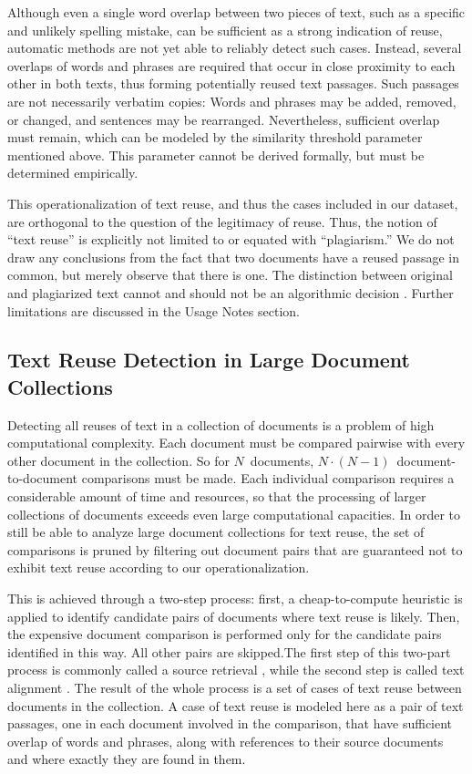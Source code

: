 \documentclass[fleqn,10pt]{wlscirep}
\begin{document}
Although even a single word overlap between two pieces of text, such as a specific and unlikely spelling mistake, can be sufficient as a strong indication of reuse, automatic methods are not yet able to reliably detect such cases. Instead, several overlaps of words and phrases are required that occur in close proximity to each other in both texts, thus forming potentially reused text passages. Such passages are not necessarily verbatim copies: Words and phrases may be added, removed, or changed, and sentences may be rearranged. Nevertheless, sufficient overlap must remain, which can be modeled by the similarity threshold parameter mentioned above. This parameter cannot be derived formally, but must be determined empirically.

This operationalization of text reuse, and thus the cases included in our dataset, are orthogonal to the question of the legitimacy of reuse. Thus, the notion of ``text reuse'' is explicitly not limited to or equated with ``plagiarism.'' We do not draw any conclusions from the fact that two documents have a reused passage in common, but merely observe that there is one. The distinction between original and plagiarized text cannot and should not be an algorithmic decision \cite{weber-wulff:2019}. Further limitations are discussed in the Usage Notes section.


\subsection*{Text Reuse Detection in Large Document Collections}

Detecting all reuses of text in a collection of documents is a problem of high computational complexity. Each document must be compared pairwise with every other document in the collection. So for $N$~documents, $N\cdot (N-1)$~document-to-document comparisons must be made. Each individual comparison requires a considerable amount of time and resources, so that the processing of larger collections of documents exceeds even large computational capacities. In order to still be able to analyze large document collections for text reuse, the set of comparisons is pruned by filtering out document pairs that are guaranteed not to exhibit text reuse according to our operationalization.

This is achieved through a two-step process: first, a cheap-to-compute heuristic is applied to identify candidate pairs of documents where text reuse is likely. Then, the expensive document comparison is performed only for the candidate pairs identified in this way. All other pairs are skipped.The first step of this two-part process is commonly called a source retrieval \cite{stein:2007d}, while the second step is called text alignment \cite{potthast:2013e}. The result of the whole process is a set of cases of text reuse between documents in the collection. A case of text reuse is modeled here as a pair of text passages, one in each document involved in the comparison, that have sufficient overlap of words and phrases, along with references to their source documents and where exactly they are found in them.
\end{document}
